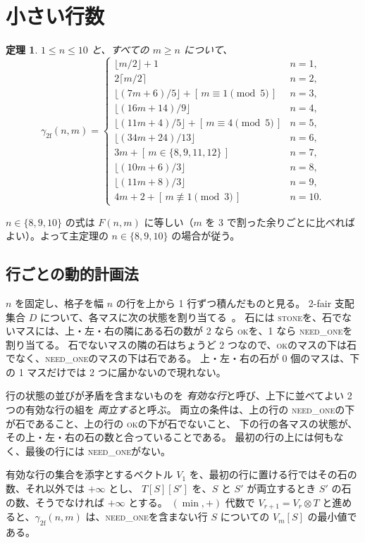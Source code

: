 \documentclass[11pt]{ltjsarticle}
\newtheorem{theorem}{定理}
\theoremstyle{definition}
\newcommand{\gf}{\gamma_{2\mathrm{f}}}
\newcommand{\iv}[1]{[\,#1\,]}
\newcommand{\stone}{\textsc{stone}}
\newcommand{\ok}{\textsc{ok}}
\newcommand{\needone}{\textsc{need\_one}}
\begin{document}
\section{小さい行数}\label{sec:small}

\begin{theorem}\label{thm:small}
$1\le n\le 10$ と、すべての $m\ge n$ について、
\[
\gf(n,m)=
\begin{cases}
\lfloor m/2\rfloor+1 & n=1,\\
2\lceil m/2\rceil & n=2,\\
\lfloor (7m+6)/5\rfloor+\iv{m\equiv 1 \pmod 5} & n=3,\\
\lfloor (16m+14)/9\rfloor & n=4,\\
\lfloor (11m+4)/5\rfloor+\iv{m\equiv 4 \pmod 5} & n=5,\\
\lfloor (34m+24)/13\rfloor & n=6,\\
3m+\iv{m\in\{8,9,11,12\}} & n=7,\\
\lfloor (10m+6)/3\rfloor & n=8,\\
\lfloor (11m+8)/3\rfloor & n=9,\\
4m+2+\iv{m\not\equiv 1 \pmod 3} & n=10.
\end{cases}
\]
\end{theorem}

$n\in\{8,9,10\}$ の式は $F(n,m)$ に等しい（$m$ を 3 で割った余りごとに比べればよい）。よって主定理の $n\in\{8,9,10\}$ の場合が従う。

\subsection{行ごとの動的計画法}
$n$ を固定し、格子を幅 $n$ の行を上から 1 行ずつ積んだものと見る。
2-fair 支配集合 $D$ について、各マスに次の状態を割り当てる~\cite{RT}。
石には \stone を、石でないマスには、上・左・右の隣にある石の数が 2 なら \ok を、1 なら \needone を割り当てる。
石でないマスの隣の石はちょうど 2 つなので、\ok のマスの下は石でなく、\needone のマスの下は石である。
上・左・右の石が 0 個のマスは、下の 1 マスだけでは 2 つに届かないので現れない。

行の状態の並びが矛盾を含まないものを \emph{有効な行}と呼び、上下に並べてよい 2 つの有効な行の組を \emph{両立する}と呼ぶ。
両立の条件は、上の行の \needone の下が石であること、上の行の \ok の下が石でないこと、
下の行の各マスの状態が、その上・左・右の石の数と合っていることである。
最初の行の上には何もなく、最後の行には \needone がない。

有効な行の集合を添字とするベクトル $V_1$ を、最初の行に置ける行ではその石の数、それ以外では $+\infty$ とし、
$T[S][S']$ を、$S$ と $S'$ が両立するとき $S'$ の石の数、そうでなければ $+\infty$ とする。
$(\min,+)$ 代数で $V_{r+1}=V_r\otimes T$ と進めると、$\gf(n,m)$ は、\needone を含まない行 $S$ についての $V_m[S]$ の最小値である。
\end{document}
